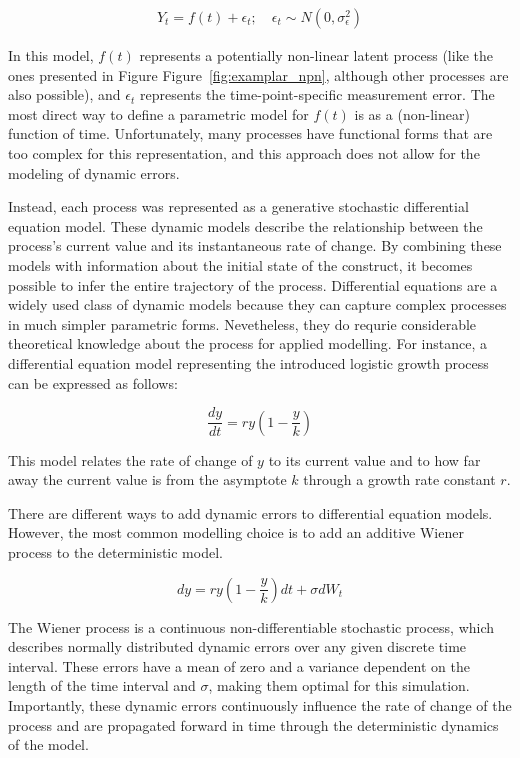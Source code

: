 \documentclass[man, floatsintext]{apa7}
\begin{document}
\begin{align}
  Y_t = f(t) + \epsilon_t; \quad \epsilon_t \sim N(0, \sigma^2_{\epsilon})
\end{align}

\noindent In this model, $f(t)$ represents a potentially non-linear latent
process
(like the ones presented in Figure Figure~\ref{fig:examplar_npn}, although
other processes are also possible), and $\epsilon_t$ represents the
time-point-specific measurement error. The most direct way to define a
parametric model for $f(t)$ is as a (non-linear) function of time.
Unfortunately, many processes have functional forms that are too complex for
this representation, and this approach does not allow for the modeling of
dynamic errors.

Instead, each process was represented as a generative stochastic differential
equation model. These dynamic models describe the relationship between the
process's current value and its instantaneous rate of change. By combining
these models with information about the initial state of the construct,
it becomes possible to
infer the entire trajectory of the process. Differential equations are a widely
used class of dynamic models because they can capture complex processes in
much simpler parametric forms. Nevetheless, they do requrie considerable
theoretical knowledge about the process for applied modelling. For instance, a
differential equation model representing the introduced logistic growth
process can be expressed as follows:

\begin{equation} \label{eq:2}
  \frac{dy}{dt} = r y (1-\frac{y}{k})
\end{equation}

\noindent This model relates the rate of change of $y$ to its current value and
to how far away the current value is from the asymptote $k$ through a
growth rate constant $r$.

There are different ways to add dynamic errors to differential equation models.
However, the most common modelling choice is to add an additive Wiener process
to the deterministic model.

\begin{equation}
  dy = r y (1-\frac{y}{k})dt + \sigma dW_t
\end{equation}

\noindent The Wiener process is a continuous non-differentiable stochastic
process, which describes normally distributed dynamic errors over any given
discrete time interval. These errors have a mean of zero and a variance
dependent on the length of the time interval and $\sigma$, making them optimal
for this simulation. Importantly, these dynamic errors continuously influence
the rate of change of the process and are propagated forward in time through
the deterministic dynamics of the model.
\end{document}

